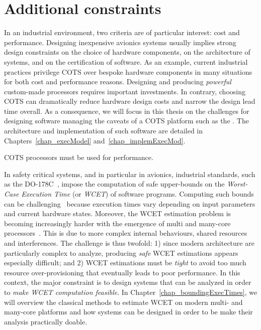 \documentclass[main.tex]{subfiles}
\begin{document}
\section{Additional constraints}
\label{sec_systemModel_additionalConstraints}
In an industrial environment, two criteria are of particular interest: cost and
performance. Designing inexpensive avionics systems usually implies strong
design constraints on the choice of hardware components, 
on the architecture of systems, and on the certification of software. 
As an example, current industrial practices privilege COTS over bespoke
hardware components in many situations for both cost and performance reasons.
Designing and producing \emph{powerful} custom-made processors requires
important investments. In contrary, choosing COTS can dramatically reduce
hardware design costs and narrow the design lead time overall. As a
consequence, we will focus in this thesis on the challenges for designing
software managing the caveats of a COTS platform such as the \mppalong. The
architecture and implementation of such software are detailed in
Chapters~\ref{chap_execModel} and~\ref{chap_implemExecMod}. 

\begin{constraint}
    \label{constr_cotsOnly}
    COTS processors must be used for performance.
\end{constraint}

In safety critical systems, and in particular in avionics, industrial
standards, such as the DO-178C~\cite{do178}, impose the computation of safe
upper-bounds on the \emph{Worst-Case Execution Time} (or \emph{WCET}) of
software programs. Computing such bounds can be challenging~\cite{Wilhelm2008}
because execution times vary depending on input parameters and current hardware
states. Moreover, the WCET estimation problem is becoming increasingly harder
with the emergence of multi and many-core processors~\cite{Wilhelm2012}. This
is due to more complex internal behaviours, shared resources and interferences.
The challenge is thus twofold: 1) since modern architecture are particularly
complex to analyze, producing \emph{safe} WCET estimations appears especially
difficult; and 2) WCET estimations must be \emph{tight} to avoid too much
resource over-provisioning that eventually leads to poor performance. In this
context, the major constraint is to design systems that can be analyzed in
order to \emph{make WCET computation feasible}. In
Chapter~\ref{chap_boundingExecTimes}, we will overview the classical methods to
estimate WCET on modern multi- and many-core platforms and how systems can be
designed in order to be make their analysis practically doable.
\end{document}

